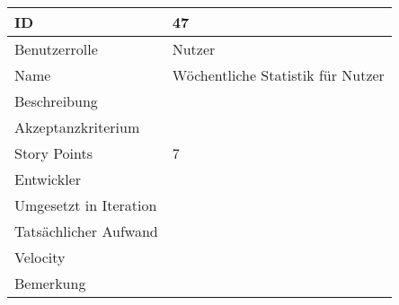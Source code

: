 \begin{tabularx}{\textwidth}{|p{}|X|}
	\hline
	ID & 47\\
	\hline
	Benutzerrolle & Nutzer\\
	\hline
	Name & Wöchentliche Statistik für Nutzer\\
	\hline
	Beschreibung & \\
	\hline
	Akzeptanzkriterium & \\
	\hline
	Story Points & 7\\
	\hline
	Entwickler & \\
	\hline
	Umgesetzt in Iteration & \\ 
	\hline
	Tatsächlicher Aufwand & \\
	\hline
	Velocity & \\
	\hline
	Bemerkung & \\
	\hline
\end{tabularx}
\vspace{20pt}
